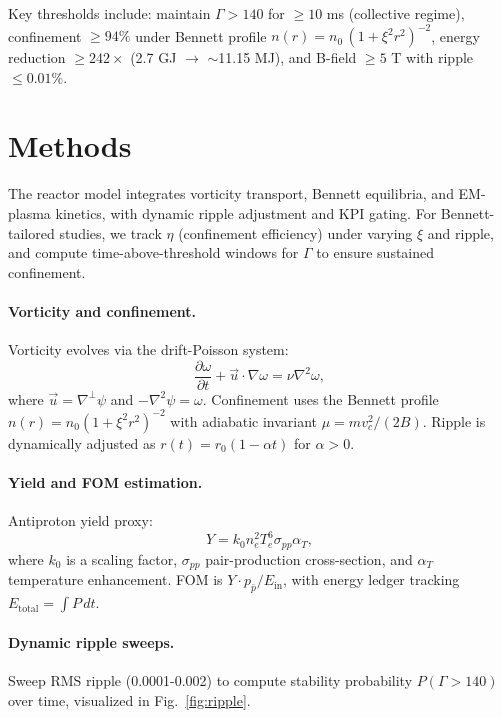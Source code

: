 \documentclass[11pt]{article}
\begin{document}
Key thresholds include: maintain $\Gamma > 140$ for $\geq 10$ ms (collective regime), confinement $\geq 94\%$ under Bennett profile $n(r)=n_0\,(1+\xi^2 r^2)^{-2}$, energy reduction $\geq 242\times$ (2.7 GJ $\to$ $\sim$11.15 MJ), and B-field $\geq 5$ T with ripple $\leq 0.01\%$.

\section{Methods}
The reactor model integrates vorticity transport, Bennett equilibria, and EM-plasma kinetics, with dynamic ripple adjustment and KPI gating. For Bennett-tailored studies, we track $\eta$ (confinement efficiency) under varying $\xi$ and ripple, and compute time-above-threshold windows for $\Gamma$ to ensure sustained confinement.

\paragraph{Vorticity and confinement.} Vorticity evolves via the drift-Poisson system:
\begin{equation}
\frac{\partial \omega}{\partial t} + \vec{u} \cdot \nabla \omega = \nu \nabla^2 \omega,
\end{equation}
where $\vec{u} = \nabla^\perp \psi$ and $-\nabla^2 \psi = \omega$. Confinement uses the Bennett profile $n(r)=n_0 (1 + \xi^2 r^2)^{-2}$ with adiabatic invariant $\mu = m v_c^2 / (2B)$. Ripple is dynamically adjusted as $r(t) = r_0 (1 - \alpha t)$ for $\alpha > 0$.

\paragraph{Yield and FOM estimation.} Antiproton yield proxy:
\begin{equation}
Y = k_0 n_e^2 T_e^6 \sigma_{pp} \alpha_T,
\end{equation}
where $k_0$ is a scaling factor, $\sigma_{pp}$ pair-production cross-section, and $\alpha_T$ temperature enhancement. FOM is $Y \cdot p_{\bar{p}} / E_{\text{in}}$, with energy ledger tracking $E_{\text{total}} = \int P \, dt$.

\paragraph{Dynamic ripple sweeps.} Sweep RMS ripple (0.0001-0.002) to compute stability probability $P(\Gamma > 140)$ over time, visualized in Fig.~\ref{fig:ripple}.
\end{document}
